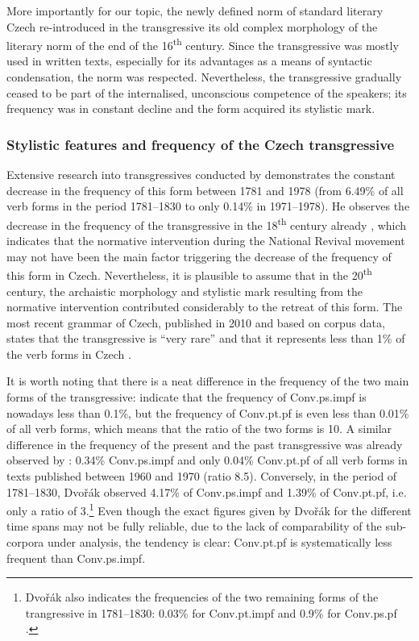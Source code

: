 \documentclass[output=paper,russian]{langsci/langscibook}
\begin{document}
More importantly for our topic, the newly defined norm of standard literary Czech re-introduced in the transgressive its old complex morphology of the literary norm of the end of the 16\textsuperscript{th} century. Since the transgressive was mostly used in written texts, especially for its advantages as a means of syntactic condensation, the norm was respected. Nevertheless, the transgressive gradually ceased to be part of the internalised, unconscious competence of the speakers; its frequency was in constant decline and the form acquired its stylistic mark. 

\subsubsection{Stylistic features and frequency of the Czech transgressive}\label{olga:sty}

Extensive research into transgressives conducted by \textcite[60]{dvorak83} demonstrates the constant decrease in the frequency of this form between 1781 and 1978 (from 6.49\% of all verb forms in the period 1781–1830 to only 0.14\% in 1971–1978). He observes the decrease in the frequency of the transgressive in the 18\textsuperscript{th} century already \parencite[142]{dvorak70}, which indicates that the normative intervention during the National Revival movement may not have been the main factor triggering the decrease of the frequency of this form in Czech. Nevertheless, it is plausible to assume that in the 20\textsuperscript{th} century, the archaistic morphology and stylistic mark resulting from the normative intervention contributed considerably to the retreat of this form. The most recent grammar of Czech, published in 2010 and based on corpus data, states that the transgressive is \enquote{very rare} and that it represents less than 1\% of the verb forms in Czech \parencite[249]{cvrcek10}.

It is worth noting that there is a neat difference in the frequency of the two main forms of the transgressive: \textcite[130]{cvrkov11} indicate that the frequency of Conv.ps.impf is nowadays less than 0.1\%, but the frequency of Conv.pt.pf is even less than 0.01\% of all verb forms, which means that the ratio of the two forms is 10. A similar difference in the frequency of the present and the past transgressive was already observed by \textcite[60]{dvorak83}: 0.34\% Conv.ps.impf and only 0.04\% Conv.pt.pf of all verb forms in texts published between 1960 and 1970 (ratio 8.5). Conversely, in the period of 1781–1830, Dvořák observed 4.17\% of Conv.ps.impf and 1.39\% of Conv.pt.pf, i.e. only a ratio of 3.\footnote{Dvořák also indicates the frequencies of the two remaining forms of the trangressive in 1781--1830: 0.03\% for Conv.pt.impf and 0.9\% for Conv.ps.pf \parencite[69]{dvorak83}.} Even though the exact figures given by Dvořák for the different time spans may not be fully reliable, due to the lack of comparability of the sub-corpora under analysis, the tendency is clear: Conv.pt.pf is systematically less frequent than Conv.ps.impf.
\end{document}
